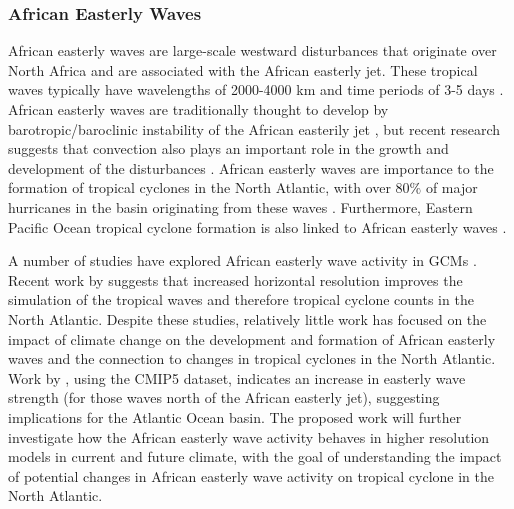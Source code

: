 \documentclass[11pt]{article}
\begin{document}
\subsubsection{African Easterly Waves}
African easterly waves are large-scale westward disturbances that originate over North Africa and are associated with the African easterly jet. These tropical waves typically have wavelengths of 2000-4000 km and time periods of 3-5 days \citep{Burpee1974,Reed1977}. African easterly waves are traditionally thought to develop by barotropic/baroclinic instability of the African easterily jet \citep{Burpee1972}, but recent research suggests that convection also plays an important role in the growth and development of the disturbances \citep{Hall2006,Thorncroft2008,Hsieh&Cook2005,Berry&Thorncroft2012}. African easterly waves are importance to the formation of tropical cyclones in the North Atlantic, with over 80$\%$ of major hurricanes in the basin originating from these waves \citep{Landsea1993}. Furthermore, Eastern Pacific Ocean tropical cyclone formation is also linked to African easterly waves \citep{Avila&Pasch1995}. 

A number of studies have explored African easterly wave activity in GCMs \citep{Ruit&DellAquila2010,Daloz2012,Skinner&Diffenbaugh2013,McCrary2014}. Recent work by \citet{Roberts2014} suggests that increased horizontal resolution improves the simulation of the tropical waves and therefore tropical cyclone counts in the North Atlantic.  Despite these studies, relatively little work has focused on the impact of climate change on the development and formation of African easterly waves and the connection to changes in tropical cyclones in the North Atlantic. Work by \citet{Skinner&Diffenbaugh2013}, using the CMIP5 dataset, indicates an increase in easterly wave strength (for those waves north of the African easterly jet), suggesting implications for the Atlantic Ocean basin. The proposed work will  further investigate how the African easterly wave activity behaves in higher resolution models in current and future climate, with the goal of understanding the impact of potential changes in African easterly wave activity on tropical cyclone in the North Atlantic.
\end{document}
